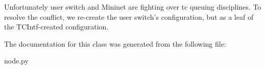\begin{DoxyVerb}Unfortunately user switch and Mininet are fighting
   over tc queuing disciplines. To resolve the conflict,
   we re-create the user switch's configuration, but as a
   leaf of the TCIntf-created configuration.\end{DoxyVerb}
 

The documentation for this class was generated from the following file\-:\begin{DoxyCompactItemize}
\item 
node.\-py\end{DoxyCompactItemize}
